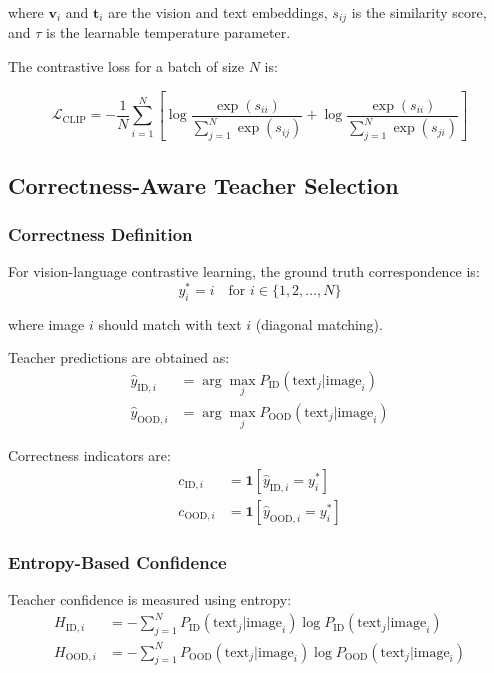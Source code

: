 \documentclass[11pt,a4paper]{article}
\begin{document}
where $\mathbf{v}_i$ and $\mathbf{t}_i$ are the vision and text embeddings, $s_{ij}$ is the similarity score, and $\tau$ is the learnable temperature parameter.

The contrastive loss for a batch of size $N$ is:

\begin{equation}
\mathcal{L}_{\text{CLIP}} = -\frac{1}{N} \sum_{i=1}^{N} \left[ \log \frac{\exp(s_{ii})}{\sum_{j=1}^{N} \exp(s_{ij})} + \log \frac{\exp(s_{ii})}{\sum_{j=1}^{N} \exp(s_{ji})} \right]
\end{equation}

\subsection{Correctness-Aware Teacher Selection}

\subsubsection{Correctness Definition}
For vision-language contrastive learning, the ground truth correspondence is:
\begin{equation}
y_i^* = i \quad \text{for } i \in \{1, 2, \ldots, N\}
\end{equation}

where image $i$ should match with text $i$ (diagonal matching).

Teacher predictions are obtained as:
\begin{align}
\hat{y}_{\text{ID}, i} &= \arg\max_j P_{\text{ID}}(\text{text}_j | \text{image}_i) \\
\hat{y}_{\text{OOD}, i} &= \arg\max_j P_{\text{OOD}}(\text{text}_j | \text{image}_i)
\end{align}

Correctness indicators are:
\begin{align}
c_{\text{ID}, i} &= \mathbf{1}[\hat{y}_{\text{ID}, i} = y_i^*] \\
c_{\text{OOD}, i} &= \mathbf{1}[\hat{y}_{\text{OOD}, i} = y_i^*]
\end{align}

\subsubsection{Entropy-Based Confidence}
Teacher confidence is measured using entropy:
\begin{align}
H_{\text{ID}, i} &= -\sum_{j=1}^{N} P_{\text{ID}}(\text{text}_j | \text{image}_i) \log P_{\text{ID}}(\text{text}_j | \text{image}_i) \\
H_{\text{OOD}, i} &= -\sum_{j=1}^{N} P_{\text{OOD}}(\text{text}_j | \text{image}_i) \log P_{\text{OOD}}(\text{text}_j | \text{image}_i)
\end{align}
\end{document}
